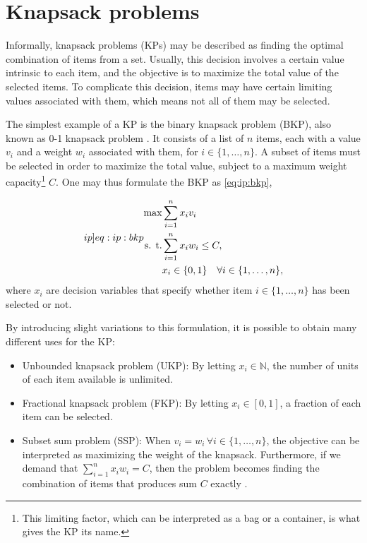 \section{Knapsack problems}

Informally, knapsack problems (KPs) may be described as finding the optimal combination of items from a set. Usually, this decision involves a certain value intrinsic to each item, and the objective is to maximize the total value of the selected items. To complicate this decision, items may have certain limiting values associated with them, which means not all of them may be selected.

The simplest example of a KP is the binary knapsack problem (BKP), also known as 0-1 knapsack problem \cite{ASSI2018}. It consists of a list of $n$ items, each with a value $v_i$ and a weight $w_i$ associated with them, for $i \in \{1,\dots,n\}$. A subset of items must be selected in order to maximize the total value, subject to a maximum weight capacity\footnote{This limiting factor, which can be interpreted as a bag or a container, is what gives the KP its name.} $C$. One may thus formulate the BKP as \cref{eq:ip:bkp},

\begin{align}
    \label[ip]{eq:ip:bkp}
    \begin{split}
        \max &\sum_{i=1}^{n}x_iv_i\\
        \textrm{s. t.}& \sum_{i=1}^{n}x_iw_i \leq C,\\
        &x_i \in \{0,1\} \quad \forall i \in \{1,\dots,n\},
    \end{split}
\end{align}
where $x_i$ are decision variables that specify whether item $i \in \{1,\dots,n\}$ has been selected or not.

By introducing slight variations to this formulation, it is possible to obtain many different uses for the KP:

\begin{itemize}
    \item Unbounded knapsack problem (UKP): By letting $x_i \in \mathbb{N}$, the number of units of each item available is unlimited.
    \item Fractional knapsack problem (FKP): By letting $x_i \in [0, 1]$, a fraction of each item can be selected.
    \item Subset sum problem (SSP): When $v_i = w_i \, \forall i \in \{1,\dots,n\}$, the objective can be interpreted as maximizing the weight of the knapsack. Furthermore, if we demand that $\sum_{i=1}^{n}x_iw_i = C$, then the problem becomes finding the combination of items that produces sum $C$ exactly \cite{FEOFILOFF2020b}.
\end{itemize}

